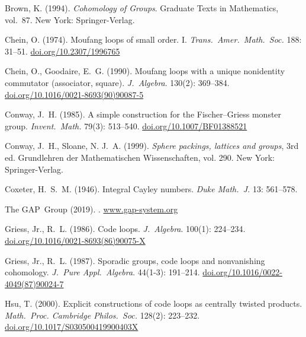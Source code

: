 \documentclass{article}
\theoremstyle{plain}
\theoremstyle{definition}
\begin{document}
% 
% 


\begin{thebibliography}{10}


Brown, K. (1994).
\newblock \emph{Cohomology of Groups}. Graduate Texts in  Mathematics, vol.~87.
\newblock New York: Springer-Verlag.

Chein, O. (1974).
\newblock Moufang loops of small order. {I}.
\newblock \emph{Trans.\ Amer.\ Math.\ Soc.} 188: 31--51.
\newblock \url{doi.org/10.2307/1996765}

Chein, O., Goodaire, E.~G. (1990).
\newblock Moufang loops with a unique nonidentity commutator (associator,
  square).
\newblock \emph{J.\ Algebra}. 130(2): 369--384.
\newblock \url{doi.org/10.1016/0021-8693(90)90087-5}

Conway, J.~H. (1985).
\newblock A simple construction for the {F}ischer--{G}riess monster group.
\newblock \emph{Invent.\ Math.} 79(3): 513--540.
\newblock \url{doi.org/10.1007/BF01388521}

Conway, J.~H., Sloane, N. J.~A. (1999).
\newblock \emph{Sphere packings, lattices and groups}, 3rd ed. Grundlehren der Mathematischen Wissenschaften, vol. 290.
\newblock New York: Springer-Verlag.

Coxeter, H.\ S.\ M. (1946).
\newblock Integral Cayley numbers.
\newblock \emph{Duke Math.\ J.} 13: 561--578.

The GAP~Group (2019).
. 
\newblock \url{www.gap-system.org}

Griess, Jr., R.~L. (1986).
\newblock Code loops.
\newblock \emph{J.\ Algebra}. 100(1): 224--234.
\newblock \url{doi.org/10.1016/0021-8693(86)90075-X}

Griess, Jr., R.~L. (1987).
\newblock Sporadic groups, code loops and nonvanishing cohomology.
\newblock \emph{J.\ Pure Appl.\ Algebra}. 44(1-3): 191--214.
\newblock \url{doi.org/10.1016/0022-4049(87)90024-7}


Hsu, T. (2000).
\newblock Explicit constructions of code loops as centrally twisted products.
\newblock \emph{Math.\ Proc. Cambridge Philos.\ Soc.} 128(2): 223--232.
\newblock \url{doi.org/10.1017/S030500419900403X}


\end{thebibliography}
\end{document}
